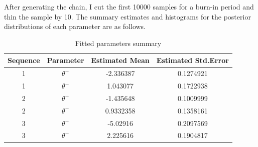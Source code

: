 \documentclass[a4paper, 11pt]{report}
\theoremstyle{definition}
\begin{document}
After generating the chain, I cut the first 10000 samples for a burn-in period and thin the sample by 10.
The summary estimates and histograms for the posterior distributions of each parameter are as follows.

\begin{table}[h!]
    \centering
        \begin{tabular}{c | c | c | c }
            Sequence & Parameter & Estimated Mean & Estimated Std.Error \\
            \hline \hline
            1 & $\theta^+$ & -2.336387 & 0.1274921 \\
            1 & $\theta^-$ & 1.043077 & 0.1722938 \\
            2 & $\theta^+$ & -1.435648 & 0.1009999 \\
            2 & $\theta^-$ & 0.9332358 & 0.1358161 \\
            3 & $\theta^+$ & -5.02916 & 0.2097569 \\
            3 & $\theta^-$ & 2.225616 & 0.1904817 \\
        \end{tabular}
        \caption{Fitted parameters summary}
    \end{table}
\end{document}
